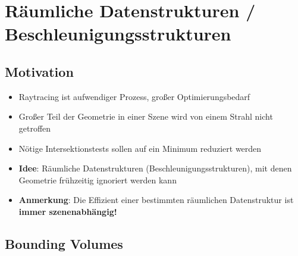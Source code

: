 \documentclass[10pt,a4paper]{article}
\begin{document}
	\newpage
	\section{Räumliche Datenstrukturen / Beschleunigungsstrukturen}
	\label{ds:sec:raeumliche_datenstrukturen_beschleunigungsstrukturen}

	\subsection{Motivation}
	\label{ds:sub:motivation}
	
	\begin{itemize}
		\item Raytracing ist aufwendiger Prozess, großer Optimierungsbedarf
		\item Großer Teil der Geometrie in einer Szene wird von einem Strahl nicht getroffen
		\item Nötige Intersektionstests sollen auf ein Minimum reduziert werden
		\item \textbf{Idee}: Räumliche Datenstrukturen (Beschleunigungsstrukturen), mit denen Geometrie frühzeitig ignoriert werden kann
		\item \textbf{Anmerkung}: Die Effizient einer bestimmten räumlichen Datenstruktur ist \textbf{immer szenenabhängig!}
	\end{itemize}

	\subsection{Bounding Volumes}
	\label{ds:sub:bounding_volumes}
\end{document}
